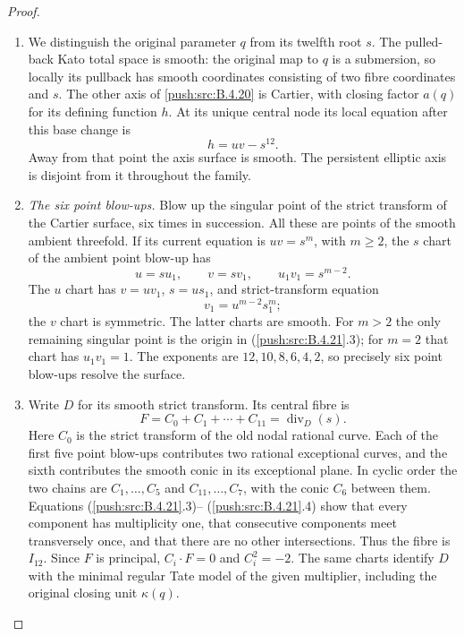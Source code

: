 \begin{proof}
\begin{enumerate}[label=\arabic*.,leftmargin=*]
\item We distinguish the original parameter $q$ from its twelfth root
$s$.  The pulled-back Kato total space is smooth: the original
map to $q$ is a submersion, so locally its pullback has smooth
coordinates consisting of two fibre coordinates and $s$.
The other axis of \ref{push:src:B.4.20} is Cartier, with closing factor $a(q)$
for its defining function $h$.  At its unique central node its
local equation after this base change is
\[
 h=uv-s^{12}.
 \tag{B.4.21.2}
\]
Away from that point the axis surface is smooth.  The persistent
elliptic axis is disjoint from it throughout the family.

\item \emph{The six point blow-ups.}
Blow up the singular point of the strict transform of the
Cartier surface, six times in succession.  All these are points
of the smooth ambient threefold.  If its current equation is
$uv=s^m$, with $m\ge2$, the $s$ chart of the ambient point
blow-up has
\[
 u=su_1,\qquad v=sv_1,
 \qquad u_1v_1=s^{m-2}.
 \tag{B.4.21.3}
\]
The $u$ chart has $v=uv_1$, $s=us_1$, and strict-transform
equation
\[
 v_1=u^{m-2}s_1^m;
 \tag{B.4.21.4}
\]
the $v$ chart is symmetric.  The latter charts are smooth.
For $m>2$ the only remaining singular point is the origin in
(\ref{push:src:B.4.21}.3); for $m=2$ that chart has $u_1v_1=1$.
The exponents are $12,10,8,6,4,2$, so precisely six point
blow-ups resolve the surface.

\item Write $D$ for its smooth strict transform.  Its central fibre is
\[
 F=C_0+C_1+\cdots+C_{11}=\operatorname{div}_D(s).
 \tag{B.4.21.5}
\]
Here $C_0$ is the strict transform of the old nodal rational
curve.  Each of the first five point blow-ups contributes two
rational exceptional curves, and the sixth contributes the
smooth conic in its exceptional plane.  In cyclic order the
two chains are $C_1,\ldots,C_5$ and $C_{11},\ldots,C_7$, with
the conic $C_6$ between them.  Equations (\ref{push:src:B.4.21}.3)--
(\ref{push:src:B.4.21}.4) show that every component has multiplicity one,
that consecutive components meet transversely once, and that
there are no other intersections.  Thus the fibre is $I_{12}$.
Since $F$ is principal, $C_i\cdot F=0$ and $C_i^2=-2$.
The same charts identify $D$ with the minimal regular Tate
model of the given multiplier, including the original closing
unit $\kappa(q)$.


\end{enumerate}
\end{proof}
